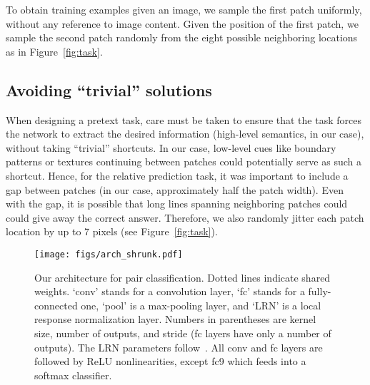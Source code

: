 \documentclass[10pt,twocolumn,letterpaper]{article}
\begin{document}
To obtain training examples given an image, we sample the first patch uniformly, without any reference to image content.
Given the position of the first patch, we sample the second patch randomly from the eight possible neighboring locations as in Figure~\ref{fig:task}.  

\vspace{-0.05in}
\subsection{Avoiding ``trivial'' solutions}
\vspace{-0.05in}

When designing a pretext task, care must be taken to ensure that the task forces the network to extract the desired information (high-level semantics, in our case), 
without taking ``trivial'' shortcuts. 
In our case, low-level cues like boundary patterns or textures continuing between patches could potentially serve as such a shortcut.  
Hence, for the relative prediction task, it was important to include a gap between patches (in our case, approximately half the patch width).  
Even with the gap, it is possible that long lines spanning neighboring patches could could give away the correct answer.
Therefore, we also randomly jitter each patch location by up to 7 pixels (see Figure~\ref{fig:task}).










\begin{figure}[t]
\begin{center}

   \texttt{[image: figs/arch\_shrunk.pdf]}
   \vspace{-.1in}
\end{center}
   \caption{Our architecture for pair classification.  Dotted lines indicate shared weights.  `conv' stands for a convolution layer, `fc' stands for a fully-connected one, `pool' is a max-pooling layer, and `LRN' is a local response normalization layer.  Numbers in parentheses are kernel size, number of outputs, and stride (fc layers have only a number of outputs).  The LRN parameters follow~\cite{krizhevsky2012imagenet}.  All conv and fc layers are followed by ReLU nonlinearities, except fc9 which feeds into a softmax classifier. }
   \vspace{-.2in}
\label{fig:arch}
\end{figure}
\end{document}
